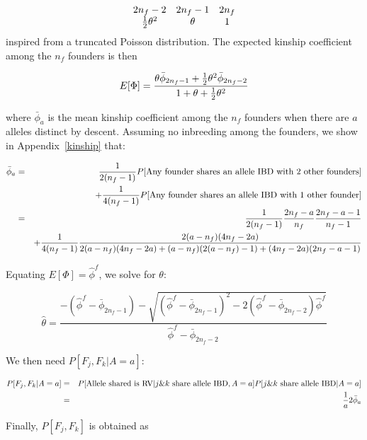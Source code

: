 \documentclass[12pt]{aastex}
\begin{document}
\begin{equation}
\begin{array}{ccc}
2n_f-2 & 2n_f-1 & 2n_f\\
{1 \over 2} \theta^2 & \theta & 1
\end{array}
\end{equation}
inspired from a truncated Poisson distribution. The expected kinship coefficient among the $n_f$ founders is then 

\begin{equation}
E[\Phi] = \frac{\theta \bar{\phi}_{2n_f-1} + {1 \over 2} \theta^2 \bar{\phi}_{2n_f-2}}{1 + \theta + {1 \over 2} \theta^2 }
\end{equation}

where $\bar{\phi}_a$ is the mean kinship coefficient among the $n_f$ founders when there are $a$ alleles distinct by descent. Assuming no inbreeding among the founders, we show in Appendix~\ref{kinship} that:

\begin{eqnarray}
\bar{\phi}_a &=& {1 \over 2(n_f-1)} P[\mbox{Any founder shares an allele IBD with 2 other founders}] \nonumber \\
& & + {1 \over 4(n_f-1)}P[\mbox{Any founder shares an allele IBD with 1 other founder}] \nonumber \\
&=& {1 \over 2(n_f-1)} \frac{2 n_f - a}{n_f} \frac{2n_f - a - 1}{n_f-1}\\
& & + {1 \over 4(n_f-1)} \frac{2(a-n_f)(4n_f - 2a)}{2(a-n_f)(4n_f - 2a) + (a-n_f)(2(a - n_f) - 1) + (4n_f - 2a)(2n_f - a - 1)}\nonumber 
\end{eqnarray}

Equating $E[\Phi] = \hat{\phi}^f$, we solve for $\theta$:

\begin{equation}
\hat{\theta} = \frac{- (\hat{\phi}^f - \bar{\phi}_{2n_f-1}) - \sqrt{(\hat{\phi}^f - \bar{\phi}_{2n_f-1})^2 - 2(\hat{\phi}^f - \bar{\phi}_{2n_f-2})\hat{\phi}^f}}{ \hat{\phi}^f - \bar{\phi}_{2n_f-2}} 
\end{equation}

We then need $P[F_j, F_k|A=a]$:

\begin{eqnarray}
P[F_j, F_k|A=a] &=& P[\mbox{Allele shared is RV} | j \& k \mbox{ share allele IBD},A=a] P[j \& k \mbox{ share allele IBD}|A=a] \nonumber \\
 &=& {1 \over a} 2 \bar{\phi}_a
\end{eqnarray} 

Finally, $P[F_j, F_k]$ is obtained as
\end{document}
